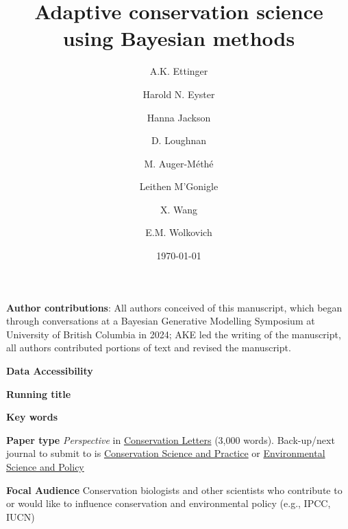 \documentclass{article}
\begin{document}



\title{Adaptive conservation science using Bayesian methods} 
\author[1,a]{A.K. Ettinger}
\author[2]{Harold N. Eyster}
\author[3]{Hanna Jackson}
\author[4,5]{D. Loughnan}
\author[6]{M. Auger-M\'eth\'e}
\author[3]{Leithen M'Gonigle}
\author[7]{X. Wang}
\author[7]{E.M. Wolkovich}





\date{\today}
\maketitle 
\textbf{Author contributions}: All authors conceived of this manuscript, which began through conversations at a Bayesian Generative Modelling Symposium at University of British Columbia in 2024; AKE led the writing of the manuscript, all authors contributed portions of text and revised the manuscript.

\textbf{Data Accessibility} 

\textbf{Running title} 

\textbf{Key words} 


\textbf{Paper type} \textit{Perspective} in \href{https://conbio.onlinelibrary.wiley.com/hub/journal/1755263x/homepage/forauthors.html#ATypes}{Conservation Letters} (3,000 words). Back-up/next journal to submit to is \href{https://conbio.onlinelibrary.wiley.com/hub/journal/25784854/homepage/author-guidelines}{Conservation Science and Practice} or \href{https://www.sciencedirect.com/journal/environmental-science-and-policy/publish/guide-for-authors}{Environmental Science and Policy}

\textbf{Focal Audience} Conservation biologists and other scientists who contribute to or would like to influence conservation and environmental policy (e.g., IPCC, IUCN)

\end{document}
